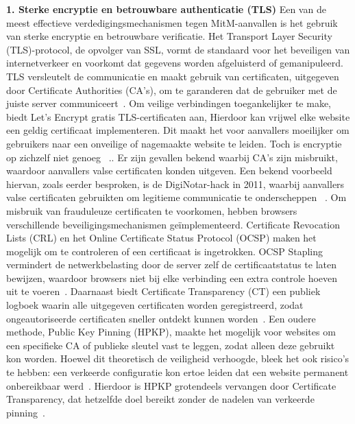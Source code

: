 \vspace{0.5cm}
\textbf{1. Sterke encryptie en betrouwbare authenticatie (TLS)}
\vspace{0.5cm}
Een van de meest effectieve verdedigingsmechanismen tegen MitM-aanvallen is het gebruik van sterke encryptie en betrouwbare verificatie. Het Transport Layer Security (TLS)-protocol, de opvolger van SSL, vormt de standaard voor het beveiligen van internetverkeer en voorkomt dat gegevens worden afgeluisterd of gemanipuleerd. TLS versleutelt de communicatie en maakt gebruik van certificaten, uitgegeven door Certificate Authorities (CA's), om te garanderen dat de gebruiker met de juiste server communiceert~\autocite{benton2013}.
Om veilige verbindingen toegankelijker te make, biedt Let’s Encrypt gratis TLS-certificaten aan, Hierdoor kan vrijwel elke website een geldig certificaat implementeren. Dit maakt het voor aanvallers moeilijker om gebruikers naar een onveilige of nagemaakte website te leiden. Toch is encryptie op zichzelf niet genoeg ~\autocite{manousis2016}.. Er zijn gevallen bekend waarbij CA’s zijn misbruikt, waardoor aanvallers valse certificaten konden uitgeven. Een bekend voorbeeld hiervan, zoals eerder besproken, is de DigiNotar-hack in 2011, waarbij aanvallers valse certificaten gebruikten om legitieme communicatie te onderscheppen ~\autocite{onderzoeksraad2012}.
Om misbruik van frauduleuze certificaten te voorkomen, hebben browsers verschillende beveiligingsmechanismen geïmplementeerd. Certificate Revocation Lists (CRL) en het Online Certificate Status Protocol (OCSP) maken het mogelijk om te controleren of een certificaat is ingetrokken. OCSP Stapling vermindert de netwerkbelasting door de server zelf de certificaatstatus te laten bewijzen, waardoor browsers niet bij elke verbinding een extra controle hoeven uit te voeren~\autocite{pkic2013}. Daarnaast biedt Certificate Transparency (CT) een publiek logboek waarin alle uitgegeven certificaten worden geregistreerd, zodat ongeautoriseerde certificaten sneller ontdekt kunnen worden~\autocite{sslcom2023}.
Een oudere methode, Public Key Pinning (HPKP), maakte het mogelijk voor websites om een specifieke CA of publieke sleutel vast te leggen, zodat alleen deze gebruikt kon worden. Hoewel dit theoretisch de veiligheid verhoogde, bleek het ook risico’s te hebben: een verkeerde configuratie kon ertoe leiden dat een website permanent onbereikbaar werd~\autocite{sslcertificaten2023}. Hierdoor is HPKP grotendeels vervangen door Certificate Transparency, dat hetzelfde doel bereikt zonder de nadelen van verkeerde pinning~\autocite{sslcertificaten2023}.
